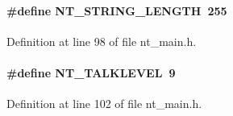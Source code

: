 \paragraph[{NT\_\-STRING\_\-LENGTH}]{\setlength{\rightskip}{0pt plus 5cm}\#define NT\_\-STRING\_\-LENGTH~255}\hfill\label{nt__main_8h_a0832498c03d15eb104f3a98f4666eba5}


Definition at line 98 of file nt\_\-main.h.

\paragraph[{NT\_\-TALKLEVEL}]{\setlength{\rightskip}{0pt plus 5cm}\#define NT\_\-TALKLEVEL~9}\hfill\label{nt__main_8h_a0e0401ad428f852321f7cd3d35444c56}


Definition at line 102 of file nt\_\-main.h.

